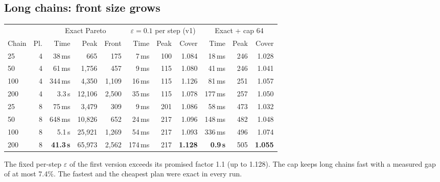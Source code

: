 \documentclass[10pt,a4paper]{article}
\begin{document}
\subsection{Long chains: front size grows}
\begin{center}\small
\begin{tabular}{@{}lr|rrr|rrr|rrr@{}}
\toprule
& & \multicolumn{3}{c|}{Exact Pareto} & \multicolumn{3}{c|}{$\varepsilon=0.1$ per step (v1)} & \multicolumn{3}{c}{Exact + cap 64}\\
Chain & Pl. & Time & Peak & Front & Time & Peak & Cover & Time & Peak & Cover\\
\midrule
25  & 4 & 38\,ms & 665 & 175 & 7\,ms & 100 & 1.084 & 18\,ms & 246 & 1.028\\
50  & 4 & 61\,ms & 1{,}756 & 457 & 9\,ms & 115 & 1.080 & 41\,ms & 246 & 1.041\\
100 & 4 & 344\,ms & 4{,}350 & 1{,}109 & 16\,ms & 115 & 1.126 & 81\,ms & 251 & 1.057\\
200 & 4 & 3.3\,s & 12{,}106 & 2{,}500 & 35\,ms & 115 & 1.078 & 177\,ms & 257 & 1.050\\
25  & 8 & 75\,ms & 3{,}479 & 309 & 9\,ms & 201 & 1.086 & 58\,ms & 473 & 1.032\\
50  & 8 & 648\,ms & 10{,}826 & 652 & 24\,ms & 217 & 1.096 & 148\,ms & 482 & 1.048\\
100 & 8 & 5.1\,s & 25{,}921 & 1{,}269 & 54\,ms & 217 & 1.093 & 336\,ms & 496 & 1.074\\
200 & 8 & \textbf{41.3\,s} & 65{,}973 & 2{,}562 & 174\,ms & 217 & \textbf{1.128} & \textbf{0.9\,s} & 505 & \textbf{1.055}\\
\bottomrule
\end{tabular}
\end{center}
The fixed per-step $\varepsilon$ of the first version exceeds its promised factor 1.1 (up to 1.128). The cap keeps
long chains fast with a measured gap of at most 7.4\%. The fastest and the cheapest plan were exact in every run.
\end{document}
